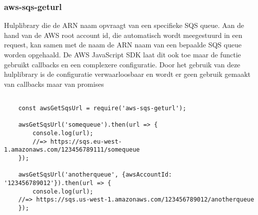 \subsubsection{aws-sqs-geturl}
Hulplibrary die de ARN naam opvraagt van een specifieke SQS queue. Aan de hand van de AWS root account id, die automatisch wordt meegestuurd in een request, kan samen met de naam de ARN naam van een bepaalde SQS queue worden opgehaald. De AWS JavaScript SDK laat dit ook toe maar de functie gebruikt callbacks en een complexere configuratie. Door het gebruik van deze hulplibrary is de configuratie verwaarloosbaar en wordt er geen gebruik gemaakt van callbacks maar van promises

\begin{lstlisting}[caption=Voorbeeld hoe de ARN van een SQS wordt opgehaald]

	const awsGetSqsUrl = require('aws-sqs-geturl');

	awsGetSqsUrl('somequeue').then(url => {
		console.log(url);
		//=> https://sqs.eu-west-1.amazonaws.com/123456789111/somequeue
	});

	awsGetSqsUrl('anotherqueue', {awsAccountId: '123456789012'}).then(url => {
		console.log(url);
	//=> https://sqs.us-west-1.amazonaws.com/123456789012/anotherqueue
	});
	
\end{lstlisting}


